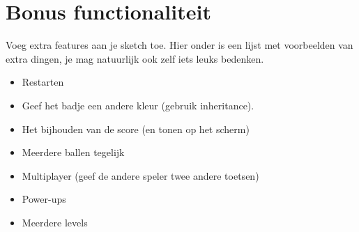 \documentclass[../syllabus.tex]{subfiles}
\begin{document}
\newpage

\section{Bonus functionaliteit}
Voeg extra features aan je sketch toe. Hier onder is een lijst met voorbeelden van extra dingen, je mag natuurlijk ook zelf iets leuks bedenken.
\begin{itemize}
    \item Restarten
    \item Geef het badje een andere kleur (gebruik inheritance).
    \item Het bijhouden van de score (en tonen op het scherm)
    \item Meerdere ballen tegelijk
    \item Multiplayer (geef de andere speler twee andere toetsen)
    \item Power-ups
    \item Meerdere levels
\end{itemize}
\end{document}
